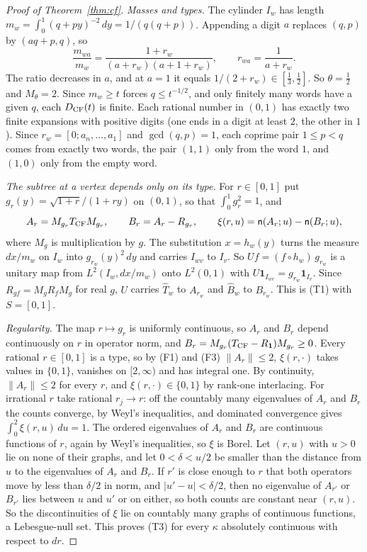\documentclass[11pt]{article}
\theoremstyle{definition}
\theoremstyle{remark}
\newcommand{\one}{\mathbf 1}
\newcommand{\ncount}{\mathsf n}
\newcommand{\norm}[1]{\left\lVert #1\right\rVert}
\begin{document}
\begin{proof}[Proof of Theorem~\ref{thm:cf}]
\emph{Masses and types.} The cylinder $I_w$ has length
$m_w=\int_0^1(q+py)^{-2}\,dy=1/(q(q+p))$. Appending a digit $a$ replaces
$(q,p)$ by $(aq+p,q)$, so
\[
 \frac{m_{wa}}{m_w}=\frac{1+r_w}{(a+r_w)(a+1+r_w)},\qquad
 r_{wa}=\frac1{a+r_w}.
\]
The ratio decreases in $a$, and at $a=1$ it equals $1/(2+r_w)\in[\frac13,\frac12]$.
So $\theta=\frac12$ and $M_\theta=2$. Since $m_w\ge t$ forces
$q\le t^{-1/2}$, and only finitely many words have a given $q$, each
$D_{\rm CF}(t)$ is finite. Each rational number in $(0,1)$ has exactly two
finite expansions with positive digits (one ends in a digit at least
$2$, the other in $1$). Since $r_w=[0;a_n,\ldots,a_1]$ and $\gcd(q,p)=1$,
each coprime pair $1\le p<q$ comes from exactly two words, the pair
$(1,1)$ only from the word $1$, and $(1,0)$ only from the empty word.

\emph{The subtree at a vertex depends only on its type.} For $r\in[0,1]$
put $g_r(y)=\sqrt{1+r}/(1+ry)$ on $(0,1)$, so that $\int_0^1g_r^2=1$, and
\[
 A_r=M_{g_r}T_{\rm CF}M_{g_r},\qquad B_r=A_r-R_{g_r},\qquad
 \xi(r,u)=\ncount(A_r;u)-\ncount(B_r;u),
\]
where $M_g$ is multiplication by $g$. The substitution $x=h_w(y)$ turns
the measure $dx/m_w$ on $I_w$ into $g_{r_w}(y)^2\,dy$ and carries $I_{wv}$
to $I_v$. So $Uf=(f\circ h_w)\,g_{r_w}$ is a unitary map from
$L^2(I_w,dx/m_w)$ onto $L^2(0,1)$ with $U\one_{I_{wv}}=g_{r_w}\one_{I_v}$.
Since $R_{gf}=M_gR_fM_g$ for real $g$, $U$ carries $\widehat T_w$ to
$A_{r_w}$ and $\widehat B_w$ to $B_{r_w}$. This is (T1) with $S=[0,1]$.

\emph{Regularity.} The map $r\mapsto g_r$ is uniformly continuous, so
$A_r$ and $B_r$ depend continuously on $r$ in operator norm, and
$B_r=M_{g_r}(T_{\rm CF}-R_\one)M_{g_r}\ge0$. Every rational $r\in[0,1]$ is
a type, so by (F1) and (F3) $\norm{A_r}\le2$, $\xi(r,\cdot)$ takes values
in $\{0,1\}$, vanishes on $[2,\infty)$ and has integral one. By
continuity, $\norm{A_r}\le2$ for every $r$, and $\xi(r,\cdot)\in\{0,1\}$
by rank-one interlacing. For irrational $r$ take rational $r_j\to r$:
off the countably many eigenvalues of $A_r$ and $B_r$ the counts
converge, by Weyl's inequalities, and dominated convergence gives
$\int_0^2\xi(r,u)\,du=1$. The ordered eigenvalues of $A_r$ and $B_r$ are
continuous functions of $r$, again by Weyl's inequalities, so $\xi$ is
Borel. Let $(r,u)$ with $u>0$ lie on none of their graphs, and let
$0<\delta<u/2$ be smaller than the distance from $u$ to the eigenvalues
of $A_r$ and $B_r$. If $r'$ is close enough to $r$ that both operators
move by less than $\delta/2$ in norm, and $|u'-u|<\delta/2$, then no
eigenvalue of $A_{r'}$ or $B_{r'}$ lies between $u$ and $u'$ or on
either, so both counts are constant near $(r,u)$. So the discontinuities of $\xi$ lie on countably many
graphs of continuous functions, a Lebesgue-null set. This proves (T3) for
every $\kappa$ absolutely continuous with respect to $dr$.


\end{proof}
\end{document}
